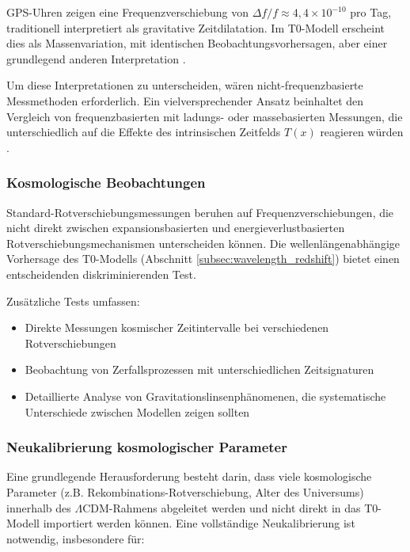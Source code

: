 \documentclass[12pt,a4paper]{article}
\newcommand{\Tfield}{T(x)}
\newcommand{\LCDM}{\Lambda\text{CDM}}
\begin{document}
	GPS-Uhren zeigen eine Frequenzverschiebung von \(\Delta f/f \approx 4,4 \times 10^{-10}\) pro Tag, traditionell interpretiert als gravitative Zeitdilatation. Im T0-Modell erscheint dies als Massenvariation, mit identischen Beobachtungsvorhersagen, aber einer grundlegend anderen Interpretation \cite{pascher_quantum_2025}.
	
	Um diese Interpretationen zu unterscheiden, wären nicht-frequenzbasierte Messmethoden erforderlich. Ein vielversprechender Ansatz beinhaltet den Vergleich von frequenzbasierten mit ladungs- oder massebasierten Messungen, die unterschiedlich auf die Effekte des intrinsischen Zeitfelds \(\Tfield\) reagieren würden \cite{pascher_quantum_2025}.
	
	\subsubsection{Kosmologische Beobachtungen}
	\label{subsec:cosmological_measurement_problem}
	
	Standard-Rotverschiebungsmessungen beruhen auf Frequenzverschiebungen, die nicht direkt zwischen expansionsbasierten und energieverlustbasierten Rotverschiebungsmechanismen unterscheiden können. Die wellenlängenabhängige Vorhersage des T0-Modells (Abschnitt \ref{subsec:wavelength_redshift}) bietet einen entscheidenden diskriminierenden Test.
	
	Zusätzliche Tests umfassen:
	\begin{itemize}
		\item Direkte Messungen kosmischer Zeitintervalle bei verschiedenen Rotverschiebungen
		\item Beobachtung von Zerfallsprozessen mit unterschiedlichen Zeitsignaturen
		\item Detaillierte Analyse von Gravitationslinsenphänomenen, die systematische Unterschiede zwischen Modellen zeigen sollten \cite{pascher_alphabeta_2025}
	\end{itemize}
	
	\subsubsection{Neukalibrierung kosmologischer Parameter}
	\label{subsec:parameter_recalibration}
	
	Eine grundlegende Herausforderung besteht darin, dass viele kosmologische Parameter (z.B. Rekombinations-Rotverschiebung, Alter des Universums) innerhalb des \(\LCDM\)-Rahmens abgeleitet werden und nicht direkt in das T0-Modell importiert werden können. Eine vollständige Neukalibrierung ist notwendig, insbesondere für:
	
\end{document}
